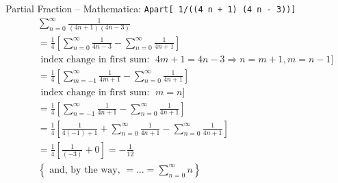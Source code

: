 \documentclass{article}
\begin{document}
Partial Fraction -- Mathematica: {\tt Apart[ 1/((4 n + 1) (4 n - 3))]}
\begin{eqnarray*}
&&
\sum_{n=0}^\infty \frac{1}{(4 n + 1) (4 n - 3)} \\
&&
=
\frac{1}{4}
\left[
\sum_{n=0}^\infty \frac{1}{4 n - 3}
-
\sum_{n=0}^\infty \frac{1}{4 n + 1}
\right] \\
&&\textrm{ index  change in first sum: }\; 4m+1=4n-3 \Rightarrow n= m+1, m=n-1]\\
&&
=
\frac{1}{4}
\left[
\sum_{m=-1}^\infty \frac{1}{4 m + 1}
-
\sum_{n=0}^\infty \frac{1}{4 n + 1}
\right] \\
&&\textrm{ index change in first sum: }\; m=n ]\\
&&
=
\frac{1}{4}
\left[
\sum_{n=-1}^\infty \frac{1}{4 n + 1}
-
\sum_{n=0}^\infty \frac{1}{4 n + 1}
\right] \\
&&
=
\frac{1}{4}
\left[
\frac{1}{4 (-1) + 1}  +
\sum_{n=0}^\infty \frac{1}{4 n + 1}
-
\sum_{n=0}^\infty \frac{1}{4 n + 1}
\right] \\
&&
=
\frac{1}{4}
\left[
\frac{1}{(-3)}  +
0
\right] = - \frac{1}{12}\\
&&
\left\{\textrm{ and, by the way, } =\ldots = \sum_{n=0}^\infty n \right\}\\
\end{eqnarray*}
\end{document}
